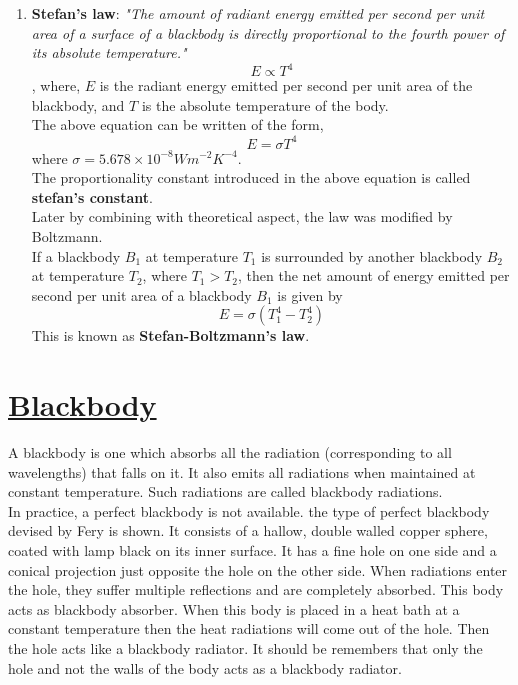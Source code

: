 \documentclass[16pt,a4paper]{article}
\begin{document}
\begin{enumerate}
    \item \textbf{Stefan's law}:  \textit{"The amount of radiant energy emitted per second per unit area of a surface of a blackbody is directly proportional to the fourth power of its absolute temperature."}
    \begin{equation}
        E \propto T^{4}
    \end{equation},
    where, $E$ is the radiant energy emitted per second per unit area of the blackbody, and $T$ is the absolute temperature of the body.\\
    The above equation can be written of the form,
    \begin{equation}
        E = \sigma T^{4}
    \end{equation}
    where $\sigma = 5.678 \times 10^{-8} Wm^{-2}K^{-4}$.\\
    The proportionality constant introduced in the above equation is called \textbf{stefan's constant}.\\
    Later by combining with theoretical aspect, the law was modified by Boltzmann.\\
    If a blackbody $B_{1}$ at temperature $T_{1}$ is surrounded by another blackbody $B_{2}$ at temperature $T_{2}$, where $T_{1}>T_{2}$, then the net amount of energy emitted per second per unit area of a blackbody $B_{1}$ is given by
    \begin{equation}
        E = \sigma(T^{4}_{1} - T^{4}_{2})
    \end{equation}
    This is known as \textbf{Stefan-Boltzmann's law}.
\end{enumerate}

\newpage
\section{\underline{Blackbody}}
A blackbody is one which absorbs all the radiation (corresponding to all wavelengths) that falls on it. It also emits all radiations when maintained at constant temperature. Such radiations are called blackbody radiations.
\\
In practice, a perfect blackbody is not available. the type of perfect blackbody devised by Fery is shown. It consists of a hallow, double walled copper sphere, coated with lamp black on its inner surface. It has a fine hole on one side and a conical projection just opposite the hole on the other side. When radiations enter the hole, they suffer multiple reflections and are completely absorbed. This body acts as blackbody absorber. When this body is placed in a heat bath at a constant temperature then the heat radiations will come out of the hole. Then the hole acts like a blackbody radiator. It should be remembers that only the hole and not the walls of the body acts as a blackbody radiator.
\end{document}
